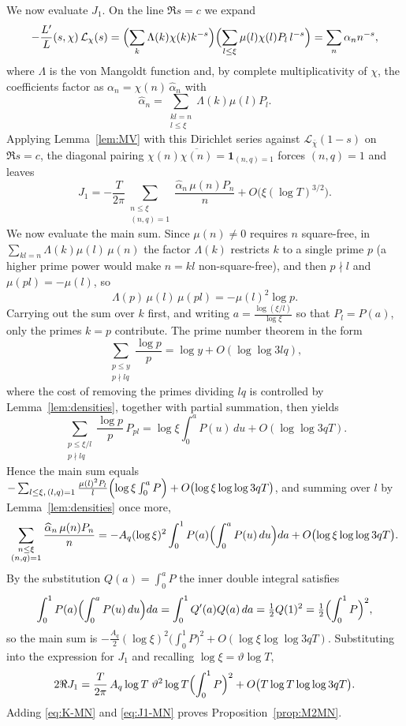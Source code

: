 \documentclass[12pt,a4paper,reqno]{amsart}
\theoremstyle{remark}
\numberwithin{equation}{section}
\begin{document}
We now evaluate $J_1$. On the line $\Re s=c$ we expand
\[
-\frac{L'}{L}(s,\chi)\,\mathcal{L}_\chi(s)=\Bigl(\sum_{k}\Lambda(k)\chi(k)k^{-s}\Bigr)\Bigl(\sum_{l\le\xi}\mu(l)\chi(l)P_l\,l^{-s}\Bigr)=\sum_{n}\alpha_n n^{-s},
\]
where $\Lambda$ is the von Mangoldt function and, by complete multiplicativity of $\chi$, the coefficients factor as $\alpha_n=\chi(n)\,\widehat\alpha_n$ with
\[
\widehat\alpha_n=\sum_{\substack{kl=n\\ l\le\xi}}\Lambda(k)\mu(l)P_l .
\]
Applying Lemma~\ref{lem:MV} with this Dirichlet series against $\mathcal{L}_{\bar\chi}(1-s)$ on $\Re s=c$, the diagonal pairing $\chi(n)\overline{\chi(n)}=\mathbf 1_{(n,q)=1}$ forces $(n,q)=1$ and leaves
\[
J_1=-\frac{T}{2\pi}\sum_{\substack{n\le\xi\\(n,q)=1}}\frac{\widehat\alpha_n\,\mu(n)P_n}{n}+O\bigl(\xi(\log T)^{3/2}\bigr).
\]
We now evaluate the main sum. Since $\mu(n)\ne0$ requires $n$ square-free, in $\sum_{kl=n}\Lambda(k)\mu(l)\,\mu(n)$ the factor $\Lambda(k)$ restricts $k$ to a single prime $p$ (a higher prime power would make $n=kl$ non-square-free), and then $p\nmid l$ and $\mu(pl)=-\mu(l)$, so
\[
\Lambda(p)\,\mu(l)\,\mu(pl)=-\mu(l)^2\log p .
\]
Carrying out the sum over $k$ first, and writing $a=\frac{\log(\xi/l)}{\log\xi}$ so that $P_l=P(a)$, only the primes $k=p$ contribute. The prime number theorem in the form
\[
\sum_{\substack{p\le y\\ p\nmid lq}}\frac{\log p}{p}=\log y+O(\log\log 3lq),
\]
where the cost of removing the primes dividing $lq$ is controlled by Lemma~\ref{lem:densities}, together with partial summation, then yields
\[
\sum_{\substack{p\le\xi/l\\ p\nmid lq}}\frac{\log p}{p}\,P_{pl}=\log\xi\int_0^a P(u)\,du+O(\log\log 3qT).
\]
Hence the main sum equals $-\sum_{l\le\xi,\,(l,q)=1}\frac{\mu(l)^2 P_l}{l}\Bigl(\log\xi\int_0^a P\Bigr)+O\bigl(\log\xi\log\log 3qT\bigr)$, and summing over $l$ by Lemma~\ref{lem:densities} once more,
\[
\sum_{\substack{n\le\xi\\(n,q)=1}}\frac{\widehat\alpha_n\,\mu(n)P_n}{n}
=-A_q(\log\xi)^2\int_0^1 P(a)\Bigl(\int_0^a P(u)\,du\Bigr)da+O\bigl(\log\xi\log\log 3qT\bigr).
\]
By the substitution $Q(a)=\int_0^a P$ the inner double integral satisfies
\[
\int_0^1 P(a)\Bigl(\int_0^a P(u)\,du\Bigr)da=\int_0^1 Q'(a)Q(a)\,da=\tfrac12 Q(1)^2=\tfrac12\Bigl(\int_0^1 P\Bigr)^2,
\]
so the main sum is $-\tfrac{A_q}{2}(\log\xi)^2\bigl(\int_0^1 P\bigr)^2+O(\log\xi\log\log 3qT)$. Substituting into the expression for $J_1$ and recalling $\log\xi=\vartheta\log T$,
\begin{equation}\label{eq:J1-MN}
2\Re J_1=\frac{T}{2\pi}\,A_q\log T\;\vartheta^2\log T\Bigl(\int_0^1 P\Bigr)^2+O\bigl(T\log T\log\log 3qT\bigr).
\end{equation}
Adding \eqref{eq:K-MN} and \eqref{eq:J1-MN} proves Proposition~\ref{prop:M2MN}.
\end{document}
